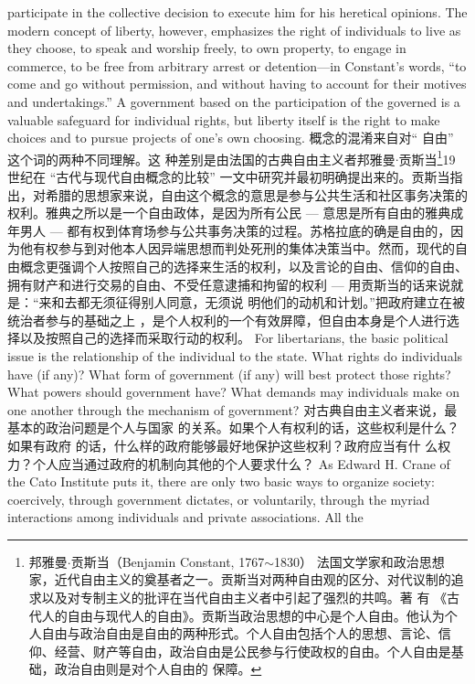 \begin{paracol}{2}
participate in the collective decision to execute him for his
heretical opinions. The modern concept of liberty, however, emphasizes the right of individuals to live as they choose, to speak
and worship freely, to own property, to engage in commerce, to
be free from arbitrary arrest or detention---in Constant's words,
``to come and go without permission, and without having to account for their motives and undertakings.'' A government based
on the participation of the governed is a valuable safeguard for
individual rights, but liberty itself is the right to make choices
and to pursue projects of one's own choosing.
\switchcolumn
概念的混淆来自对“ 自由” 这个词的两种不同理解。这
种差别是由法国的古典自由主义者邦雅曼$\cdot$贡斯当\footnote{邦雅曼$\cdot$贡斯当（Benjamin Constant, 1767$\sim$1830） 法国文学家和政治思想家，近代自由主义的奠基者之一。贡斯当对两种自由观的区分、对代议制的追求以及对专制主义的批评在当代自由主义者中引起了强烈的共鸣。著 有 《古代人的自由与现代人的自由》。贡斯当政治思想的中心是个人自由。他认为个人自由与政治自由是自由的两种形式。个人自由包括个人的思想、言论、信仰、经营、财产等自由，政治自由是公民参与行使政权的自由。个人自由是基础，政治自由则是对个人自由的 保障。}19世纪在 “古代与现代自由概念的比较” 一文中研究并最初明确提出来的。贡斯当指出，对希腊的思想家来说，自由这个概念的意思是参与公共生活和社区事务决策的权利。雅典之所以是一个自由政体，是因为所有公民 --- 意思是所有自由的雅典成年男人 --- 都有权到体育场参与公共事务决策的过程。苏格拉底的确是自由的，因为他有权参与到对他本人因异端思想而判处死刑的集体决策当中。然而，现代的自由概念更强调个人按照自己的选择来生活的权利，以及言论的自由、信仰的自由、拥有财产和进行交易的自由、不受任意逮捕和拘留的权利 --- 用贡斯当的话来说就是：“来和去都无须征得别人同意，无须说
明他们的动机和计划。”把政府建立在被统治者参与的基础之上 ，是个人权利的一个有效屏障，但自由本身是个人进行选择以及按照自己的选择而采取行动的权利。
\switchcolumn*
For libertarians, the basic political issue is the relationship of
the individual to the state. What rights do individuals have (if
any)? What form of government (if any) will best protect those
rights? What powers should government have? What demands
may individuals make on one another through the mechanism
of government?
\switchcolumn
对古典自由主义者来说，最基本的政治问题是个人与国家
的关系。如果个人有权利的话，这些权利是什么？如果有政府
的话，什么样的政府能够最好地保护这些权利？政府应当有什
么权力？个人应当通过政府的机制向其他的个人要求什么？
\switchcolumn*
As Edward H. Crane of the Cato Institute puts it, there are
only two basic ways to organize society: coercively, through
government dictates, or voluntarily, through the myriad interactions among individuals and private associations. All the

\end{paracol}
